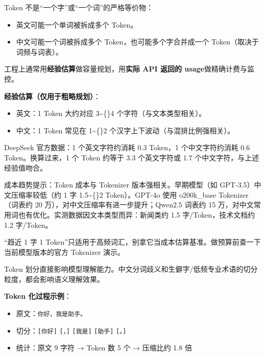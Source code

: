 \documentclass[9pt,a4paper,twocolumn]{ctexart}
\begin{document}
Token 不是“一个字”或“一个词”的严格等价物：


\begin{itemize}[itemsep=1pt, topsep=2pt]
  \item 英文可能一个单词被拆成多个 Token。
  \item 中文可能一个词被拆成多个 Token，也可能多个字合并成一个 Token（取决于词频与词表）。
\end{itemize}


工程上通常用\textbf{经验估算}做容量规划，用\textbf{实际 API 返回的 usage}做精确计费与监控。



\textbf{经验估算（仅用于粗略规划）}：


\begin{itemize}[itemsep=1pt, topsep=2pt]
  \item 英文：1 Token 大约对应 3\textasciitilde\{\}4 个字符（与文本类型相关）。
  \item 中文：1 Token 常见在 1\textasciitilde\{\}2 个汉字上下波动（与混排比例强相关）。
\end{itemize}


DeepSeek 官方数据：1 个英文字符约消耗 0.3 Token，1 个中文字符约消耗 0.6 Token。换算过来，1 个 Token 约等于 3.3 个英文字符或 1.7 个中文字符，与上述经验值吻合。



成本趋势提示：Token 成本与 Tokenizer 版本强相关。早期模型（如 GPT-3.5）中文压缩率较低（约 1 字 1.5\textasciitilde\{\}2 Token）。GPT-4o 使用 o200k\_base Tokenizer（词表约 20 万），对中文压缩率有进一步提升；Qwen2.5 词表约 15 万，对中文常用词也有优化。实测数据因文本类型而异：新闻类约 1.5 字/Token，技术文档约 1.2 字/Token。



“趋近 1 字 1 Token”只适用于高频词汇，别拿它当成本估算基准。做预算前查一下当前模型版本的官方 Tokenizer 演示。



Token 划分直接影响模型理解能力。中文分词歧义和生僻字/低频专业术语的切分粒度，都会影响语义理解效果。



\textbf{Token 化过程示例}：


\begin{itemize}[itemsep=1pt, topsep=2pt]
  \item 原文：\texttt{你好，我是助手。}
  \item 切分：\texttt{[你好]} \texttt{[，]} \texttt{[我是]} \texttt{[助手]} \texttt{[。]}
  \item 统计：原文 9 字符 → Token 数 5 个 → 压缩比约 1.8 倍
\end{itemize}
\end{document}
